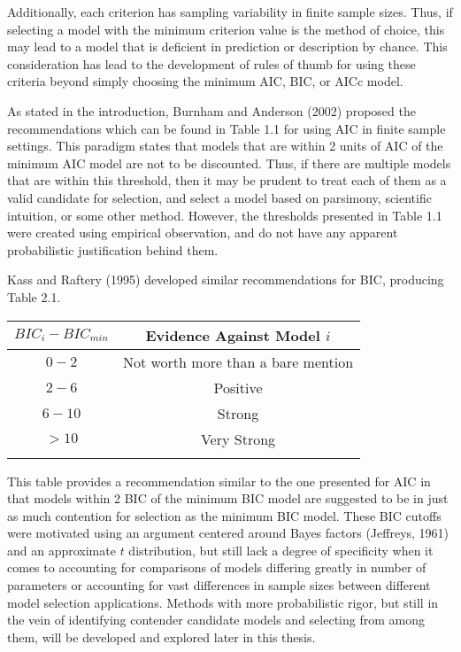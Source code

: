 		Additionally, each criterion has sampling variability in finite sample sizes. Thus, if selecting a model with the minimum criterion value is the method of choice, this may lead to a model that is
		deficient in prediction or description by chance. This consideration has lead to the development of rules of thumb for using these criteria beyond simply choosing the minimum AIC, BIC, or AICc model.

		As stated in the introduction, Burnham and Anderson (2002) proposed the recommendations which can be found in Table 1.1 for using AIC in finite sample settings. This paradigm states that models
		that are within 2 units of AIC of the minimum AIC model are not to be discounted. Thus, if there are multiple models that are within this threshold, then it may be prudent to treat each of them
		as a valid candidate for selection, and select a model based on parsimony, scientific intuition, or some other method. However, the thresholds presented in Table 1.1 were created using empirical
		observation, and do not have any apparent probabilistic justification behind them.

		Kass and Raftery (1995) developed similar recommendations for BIC, producing Table 2.1.
		\begin{table}[H]
		\centering
		{
		\begin{tabular}{ c|c}
		$BIC_{i}-BIC_{min}$ & Evidence Against Model $i$\\
		 \hline
		 $0 - 2$ & Not worth more than a bare mention\\
		 $2 - 6$ & Positive\\
		 $6 - 10$ & Strong\\
		 $> 10$ & Very Strong\\
		 \Xhline{3\arrayrulewidth}
		\end{tabular}
		}
		\end{table}
		This table provides a recommendation similar to the one presented for AIC in that models within 2 BIC of the minimum BIC model are suggested to be in just as much contention for selection as
		the minimum BIC model. These BIC cutoffs were motivated using an argument centered around Bayes factors (Jeffreys, 1961) and an approximate $t$ distribution, but still lack a degree of specificity
		when it comes to accounting for comparisons of models differing greatly in number of parameters or accounting for vast differences in sample sizes between different model selection applications.
		Methods with more probabilistic rigor, but still in the vein of identifying contender candidate models and selecting from among them, will be developed and explored later in this thesis.

